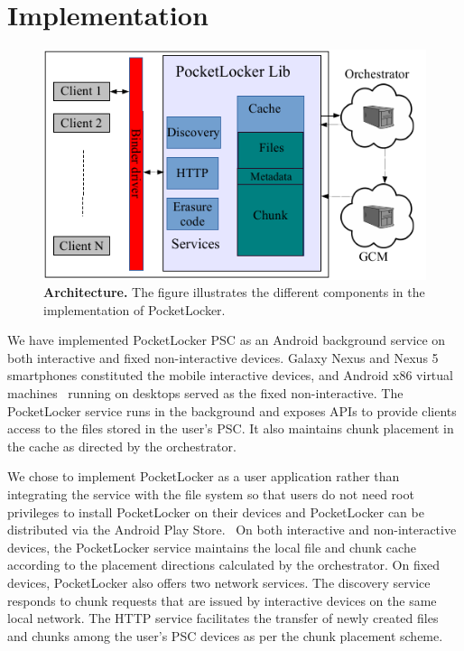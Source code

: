 
\section{Implementation}
\label{sec-implementation}

\begin{figure}[t]

\includegraphics[width=\columnwidth]{./figures/implementation.pdf}

\caption{\small \textbf{Architecture.} The figure illustrates the different
  components in the implementation of PocketLocker.}

\label{fig-implementation}
  \vspace*{-0.2in}

\end{figure}

We have implemented PocketLocker PSC as an Android background service on both
interactive and fixed non-interactive devices. Galaxy Nexus and Nexus 5
smartphones constituted the mobile interactive devices, and Android x86
virtual machines~\cite{androidx86} running on desktops served as the fixed
non-interactive. The PocketLocker service runs in the background and exposes
APIs to provide clients access to the files stored in the user's PSC. It also
maintains chunk placement in the cache as directed by the orchestrator. 

We chose to implement PocketLocker as a user application rather than
integrating the service with the file system so that users do not need root
privileges to install PocketLocker on their devices and PocketLocker can be
distributed via the Android Play Store.~\cite{playstore} On both interactive
and non-interactive devices, the PocketLocker service maintains the local file
and chunk cache according to the placement directions calculated by the
orchestrator. On fixed devices, PocketLocker also offers two network services.
The discovery service responds to chunk requests that are issued by interactive
devices on the same local network. The HTTP service facilitates the transfer of
newly created files and chunks among the user's PSC devices as per the chunk
placement scheme.

